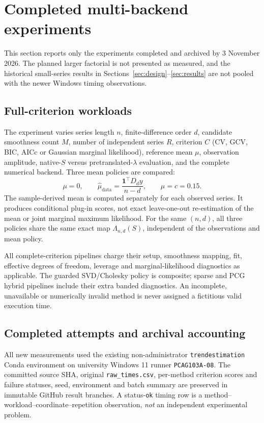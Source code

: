 \section{Completed multi-backend experiments}\label{sec:experiment010}
This section reports only the experiments completed and archived by 3 November
2026. The planned larger factorial is not presented as measured, and the
historical small-series results in Sections~\ref{sec:design}--\ref{sec:results}
are not pooled with the newer Windows timing observations.

\subsection{Full-criterion workloads}
The experiment varies series length $n$, finite-difference order $d$,
candidate smoothness count $M$, number of independent series $R$,
criterion $C$ (CV, GCV, BIC, AICc or Gaussian marginal likelihood),
reference mean $\mu$, observation amplitude, native-$S$ versus
pretranslated-$\lambda$ evaluation, and the complete numerical backend.
Three mean policies are compared:
\[
\mu=0,\qquad
\widehat\mu_{\mathrm{data}}=\frac{\mathbf1^\top D_dy}{n-d},\qquad
\mu=c=0.15.
\]
The sample-derived mean is computed separately for each observed series.
It produces conditional plug-in scores, not exact leave-one-out
re-estimation of the mean or joint marginal maximum likelihood.
For the same $(n,d)$, all three policies share the same exact map
$\Lambda_{n,d}(S)$, independent of the observations and mean policy.

All complete-criterion pipelines charge their setup, smoothness mapping,
fit, effective degrees of freedom, leverage and marginal-likelihood
diagnostics as applicable. The guarded SVD/Cholesky policy is composite;
sparse and PCG hybrid pipelines include their extra banded diagnostics.
An incomplete, unavailable or numerically invalid method is never
assigned a fictitious valid execution time.

\subsection{Completed attempts and archival accounting}
All new measurements used the existing non-administrator
\texttt{trendestimation} Conda environment on university Windows 11
runner \texttt{PCAG103A-08}. The committed source SHA, original
\texttt{raw\_times.csv}, per-method criterion scores and failure
statuses, seed, environment and batch summary are preserved in
immutable GitHub result branches. A status-\texttt{ok} timing row
is a method--workload--coordinate--repetition observation,
\emph{not} an independent experimental problem.

